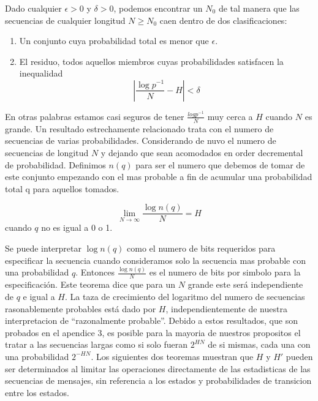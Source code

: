 \begin{theorem}
\label{th:3}
Dado cualquier $\epsilon > 0$ y $\delta > 0$, podemos encontrar un
$N_{0}$ de tal manera que las secuencias de cualquier longitud $N \geq
N_{0}$ caen dentro de dos clasificaciones:
\begin{enumerate}
\item Un conjunto cuya probabilidad total es menor que $\epsilon$.
\item El residuo, todos aquellos miembros cuyas probabilidades satisfacen la inequalidad
\begin{equation}
|\frac{\log p^{-1}}{N} - H| < \delta
\end{equation}
\end{enumerate}
\end{theorem}

En otras palabras estamos casi seguros de tener $\frac{log p^{-1}}{N}$
muy cerca a $H$ cuando $N$ es grande.  Un resultado estrechamente
relacionado trata con el numero de secuencias de varias
probabilidades. Considerando de nuvo el numero de secuencias de
longitud $N$ y dejando que sean acomodados en order decremental de
probabilidad. Definimos $n(q)$ para ser el numero que debemos de tomar
de este conjunto empezando con el mas probable a fin de acumular una
probabilidad total q para aquellos tomados.

\begin{theorem}
\label{th:4}
\begin{equation}
\lim_{N \rightarrow \infty} \frac{\log n(q)}{N} = H
\end{equation}
cuando $q$ no es igual a 0 o 1.
\end{theorem}

Se puede interpretar $\log n(q)$ como el numero de bits requeridos
para especificar la secuencia cuando consideramos solo la secuencia
mas probable con una probabilidad $q$. Entonces $\frac{\log n(q)}{N}$
es el numero de bits por simbolo para la especificaci\'{o}n. Este
teorema dice que para un $N$ grande este ser\'{a} independiente de $q$
e igual a $H$. La taza de crecimiento del logaritmo del numero de
secuencias rasonablemente probables est\'{a} dado por $H$,
independientemente de nuestra interpretacion de ``razonalmente
probable''. Debido a estos resultados, que son probados en el apendice
3, es posible para la mayoria de nuestros propositos el tratar a las
secuencias largas como si solo fueran $2^{HN}$ de si mismas, cada una
con una probabilidad $2^{-HN}$.  Los siguientes dos teoremas muestran
que $H$ y $H'$ pueden ser determinados al limitar las operaciones
directamente de las estadisticas de las secuencias de mensajes, sin
referencia a los estados y probabilidades de transicion entre los
estados.

